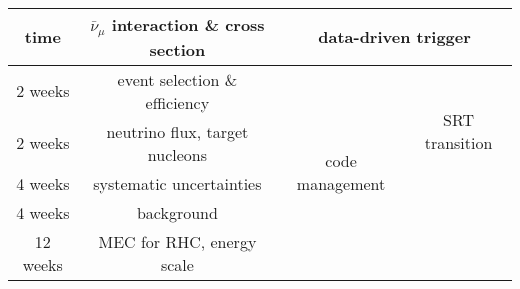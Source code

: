 \documentclass[a4paper, 11pt]{article} %
\begin{document}
\begin{table}[!htbp]
  \centering
  \begin{tabular}{|c|c|c|c|}
    \hline
    time & $\bar{\nu}_\mu$ interaction \& cross section & \multicolumn{2}{c|}{data-driven trigger} \\
    \hline
    2 weeks & event selection \& efficiency & \multirow{5}{*}{code management} & \multirow{3}{*}{SRT transition} \\
    \hhline{--~~}
    2 weeks & neutrino flux, target nucleons & & \\
    \hhline{--~~}
    4 weeks & systematic uncertainties & & \\
    \hhline{--~-}
    4 weeks & background & & \\
    \hhline{--~}
    12 weeks & MEC for RHC, energy scale & & \\
	\hline
  \end{tabular}
  \label{T:peak}
\end{table}






\end{document}
